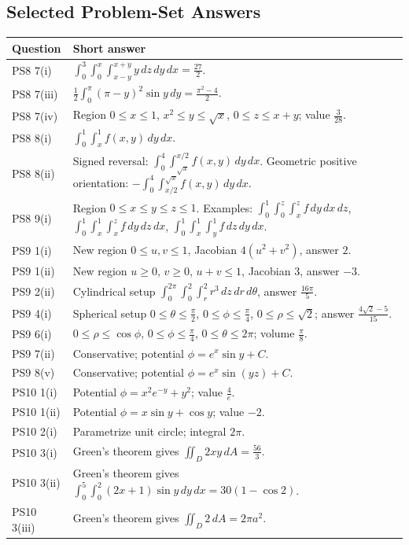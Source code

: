 \documentclass[11pt]{article}
\begin{document}
\subsection*{Selected Problem-Set Answers}

\begin{longtable}{>{\raggedright\arraybackslash}p{}>{\raggedright\arraybackslash}p{}}
\toprule
Question & Short answer \\
\midrule
PS8 7(i) & $\displaystyle \int_0^3\int_0^x\int_{x-y}^{x+y}y\,dz\,dy\,dx=\frac{27}{2}$.\\
PS8 7(iii) & $\displaystyle \frac12\int_0^\pi(\pi-y)^2\sin y\,dy=\frac{\pi^2-4}{2}$.\\
PS8 7(iv) & Region $0\le x\le1$, $x^2\le y\le\sqrt x$, $0\le z\le x+y$; value $\displaystyle \frac{3}{28}$.\\
PS8 8(i) & $\displaystyle \int_0^1\int_x^1 f(x,y)\,dy\,dx$.\\
PS8 8(ii) & Signed reversal: $\displaystyle \int_0^4\int_{\sqrt x}^{x/2}f(x,y)\,dy\,dx$. Geometric positive orientation: $-\int_0^4\int_{x/2}^{\sqrt x}f(x,y)\,dy\,dx$.\\
PS8 9(i) & Region $0\le x\le y\le z\le1$. Examples: $\int_0^1\int_0^z\int_x^z f\,dy\,dx\,dz$, $\int_0^1\int_x^1\int_x^z f\,dy\,dz\,dx$, $\int_0^1\int_x^1\int_y^1 f\,dz\,dy\,dx$.\\
PS9 1(i) & New region $0\le u,v\le1$, Jacobian $4(u^2+v^2)$, answer $2$.\\
PS9 1(ii) & New region $u\ge0$, $v\ge0$, $u+v\le1$, Jacobian $3$, answer $-3$.\\
PS9 2(ii) & Cylindrical setup $\int_0^{2\pi}\int_0^2\int_r^2 r^3\,dz\,dr\,d\theta$, answer $\frac{16\pi}{5}$.\\
PS9 4(i) & Spherical setup $0\le\theta\le\frac\pi2$, $0\le\phi\le\frac\pi4$, $0\le\rho\le\sqrt2$; answer $\frac{4\sqrt2-5}{15}$.\\
PS9 6(i) & $0\le\rho\le\cos\phi$, $0\le\phi\le\frac\pi4$, $0\le\theta\le2\pi$; volume $\frac{\pi}{8}$.\\
PS9 7(ii) & Conservative; potential $\phi=e^x\sin y+C$.\\
PS9 8(v) & Conservative; potential $\phi=e^x\sin(yz)+C$.\\
PS10 1(i) & Potential $\phi=x^2e^{-y}+y^2$; value $\frac4e$.\\
PS10 1(ii) & Potential $\phi=x\sin y+\cos y$; value $-2$.\\
PS10 2(i) & Parametrize unit circle; integral $2\pi$.\\
PS10 3(i) & Green's theorem gives $\iint_D2xy\,dA=\frac{56}{3}$.\\
PS10 3(ii) & Green's theorem gives $\int_0^5\int_0^2(2x+1)\sin y\,dy\,dx=30(1-\cos2)$.\\
PS10 3(iii) & Green's theorem gives $\iint_D2\,dA=2\pi a^2$.\\
\bottomrule
\end{longtable}
\end{document}
